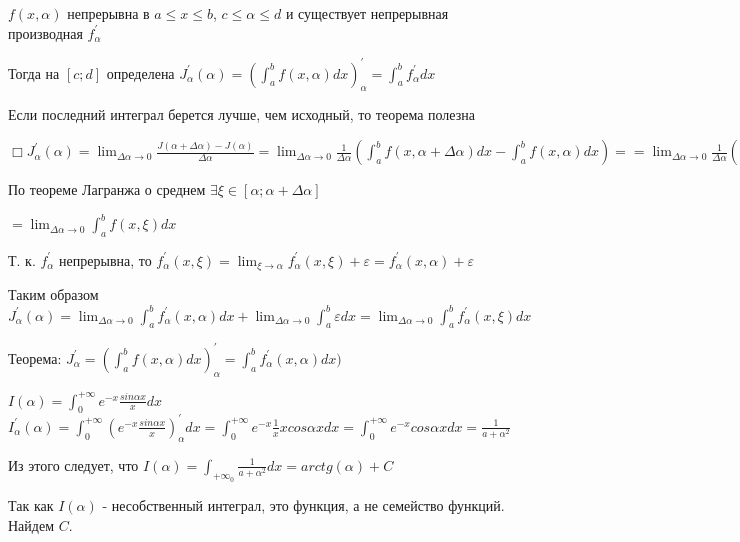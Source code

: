 \documentclass[12pt]{article}
\begin{document}
    $f(x, \alpha)$ непрерывна в $a \leq x \leq b$, $c \leq \alpha \leq d$ и существует непрерывная производная $f^\prime_\alpha$

    Тогда на $[c;d]$ определена $J^\prime_\alpha(\alpha) = \left(\int^b_a f(x, \alpha)dx\right)^\prime_\alpha = \int^b_a f^\prime_\alpha dx$

    Если последний интеграл берется лучше, чем исходный, то теорема полезна

    $\displaystyle \Box J^\prime_\alpha(\alpha) = \lim_{\Delta \alpha \to 0} \frac{J(\alpha + \Delta \alpha) - J(\alpha)}{\Delta \alpha} =
    \lim_{\Delta \alpha \to 0} \frac{1}{\Delta \alpha} \left(\int^b_a f(x, \alpha + \Delta \alpha)dx - \int^b_a f(x, \alpha)dx\right) =
    = \lim_{\Delta \alpha \to 0} \frac{1}{\Delta \alpha} \left(\int^b_a (f(x, \alpha + \Delta \alpha) - f(x, \alpha))dx\right)$

    По теореме Лагранжа о среднем $\exists \xi \in [\alpha; \alpha + \Delta \alpha]$

    $\displaystyle = \lim_{\Delta \alpha \to 0} \int^b_a f(x, \xi)dx$

    Т. к. $f^\prime_\alpha$ непрерывна, то $\displaystyle f^\prime_\alpha (x, \xi) = \lim_{\xi \to \alpha} f^\prime_\alpha (x, \xi) + \varepsilon = f^\prime_\alpha (x, \alpha) + \varepsilon$

    Таким образом $\displaystyle J^\prime_\alpha(\alpha) = \lim_{\Delta \alpha \to 0} \int^{b}_{a} f^\prime_{\alpha}(x, \alpha) dx + \lim_{\Delta \alpha \to 0} \int^{b}_{a} \varepsilon dx =
    \lim_{\Delta \alpha \to 0} \int^{b}_{a} f^\prime_{\alpha}(x, \xi) dx$



    Теорема: $\displaystyle J^\prime_\alpha = \left(\int^b_a f(x, \alpha)dx\right)^\prime_\alpha = \int^b_a f^\prime_\alpha(x, \alpha)dx)$

    \Ex

    $\displaystyle I(\alpha) = \int^{+\infty}_0 e^{-x} \frac{sin\alpha x}{x}dx$
    $\displaystyle I^\prime_\alpha(\alpha) = \int^{+\infty}_0 (e^{-x} \frac{sin\alpha x}{x})^\prime_\alpha dx = \int^{+\infty}_0 e^{-x} \frac{1}{x} x cos\alpha x dx =
    \int^{+\infty}_0 e^{-x} cos\alpha x dx = \frac{1}{a + \alpha^2}$

    Из этого следует, что $\displaystyle I(\alpha) = \int_{+\infty}_{0} \frac{1}{a + \alpha^2} dx = arctg(\alpha) + C$

    Так как $I(\alpha)$ - несобственный интеграл, это функция, а не семейство функций. Найдем $C$.
\end{document}
